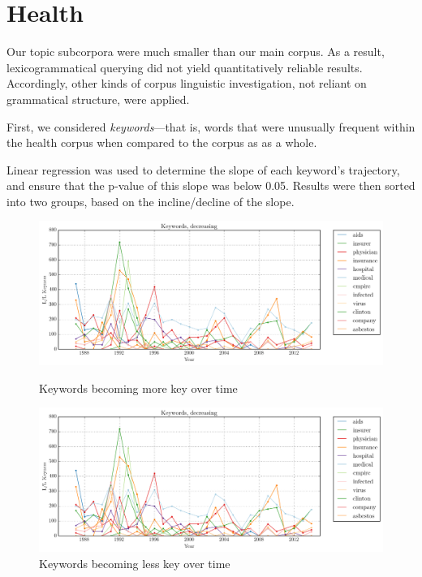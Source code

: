 \section{Health}

    Our topic subcorpora were much smaller than our main corpus. As a result, lexicogrammatical querying did not yield quantitatively reliable results. Accordingly, other kinds of corpus linguistic investigation, not reliant on grammatical structure, were applied. 

    First, we considered \emph{keywords}---that is, words that were unusually frequent within the health corpus when compared to the corpus as as a whole.

    Linear regression was used to determine the slope of each keyword's trajectory, and ensure that the p-value of this slope was below 0.05. Results were then sorted into two groups, based on the incline\slash decline of the slope.

    \noindent
    \begin{figure}[htb!]
    \centering
    \begin{minipage}{.45\textwidth}
    \centering
    \includegraphics[width=.95\textwidth]{../images/keywords-decreasing.png}
    \caption{Keywords becoming more key over time}
    \label{fig:key-inc}
    \end{minipage}%
    \begin{minipage}{.55\textwidth}
    \centering
    \includegraphics[width=.95\textwidth]{../images/keywords-decreasing.png}
    \caption{Keywords becoming less key over time}
    \label{fig:key-dec}
    \end{minipage}
    \end{figure}

